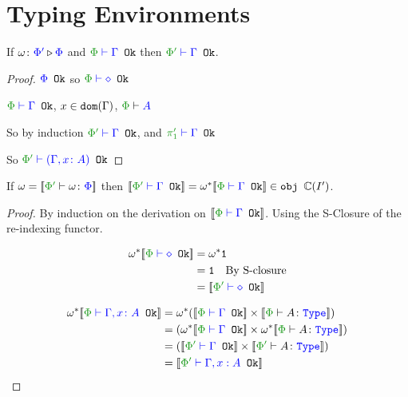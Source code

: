 \documentclass{report}
\begin{document}
\section{Typing Environments}
 
\begin{theorem}
    If $\omega \colon {\color{blue}\Phi'} \triangleright {\color {blue} \Phi}$ and $\wellformedok{\P}{\G}$  then $\wellformedok{\P'}{\G}$.
\end{theorem}

\begin{framed}
     \begin{proof}
            \bi ${\color{blue} \Phi} \texttt{ Ok}$ so $\wellformedok{\P}{\nil}$
        
            \bi $\wellformedok{\P}{\G}$, $x\in\texttt{dom}(\Gamma)$, $\wellformed{\P}{A}$
        
            So by induction $\wellformedok{\P'}{\G}$, and $\wellformedok{\p'}{\G}$
        
            So $\wellformedok{\P'}{(\gax)}$
     \end{proof}
        
    
\end{framed}
\begin{theorem}
      
    If $\w = \deno{\typerelation{\P'}{\w}{\P}}$ then $\deno{\wellformedok{\P'}{\G}} = \w\star\deno{\wellformedok{\P}{\G}}\in\obj\C(I')$.
\end{theorem}

\begin{framed}
    \begin{proof}
        By induction on the derivation on $\deno{\wellformedok{\P}{\G}}$. Using the S-Closure of the re-indexing functor.
        
        \begin{align*}
            \w\star\deno{\wellformedok{\P}{\nil}} &=\w\star\1\\
            & = \1\qt{By S-closure}\\
            &= \deno{\wellformedok{\P'}{\nil}}\\
        \end{align*}
        
        \begin{align*}
           \w\star\deno{\wellformedok{\P}{\gax}} &= \w\star(\deno{\wellformedok{\P}{\G}} \times \deno{\typerelation{\P}{A}{\type}}) \\
           & = (\w\star\deno{\wellformedok{\P}{\G}} \times \w\star\deno{\typerelation{\P}{A}{\type}})\\
            & = (\deno{\wellformedok{\P'}{\G}} \times \deno{\typerelation{\P'}{A}{\type}})\\
            & = \deno{\wellformedok{\P'}{\G, x: A}}\\
        \end{align*}
        
    \end{proof}
\end{framed}
\end{document}
